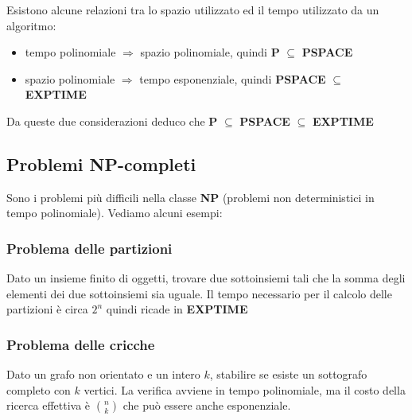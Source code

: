 \noindent Esistono alcune relazioni tra lo spazio utilizzato ed il tempo utilizzato da un algoritmo:
\begin{itemize}
    \item tempo polinomiale $\Rightarrow$ spazio polinomiale, quindi \textbf{P} $\subseteq$ \textbf{PSPACE}
    \item spazio polinomiale $\Rightarrow$ tempo esponenziale, quindi \textbf{PSPACE} $\subseteq$ \textbf{EXPTIME}
\end{itemize}

\noindent Da queste due considerazioni deduco che \textbf{P} $\subseteq$ \textbf{PSPACE} $\subseteq$ \textbf{EXPTIME}

\subsection{Problemi NP-completi}
Sono i problemi più difficili nella classe \textbf{NP} (problemi non deterministici in tempo polinomiale).
Vediamo alcuni esempi:
\subsubsection*{Problema delle partizioni}
Dato un insieme finito di oggetti, trovare due sottoinsiemi tali che la somma degli elementi dei due sottoinsiemi
sia uguale. Il tempo necessario per il calcolo delle partizioni è circa $2^n$ quindi ricade
in \textbf{EXPTIME}

\subsubsection*{Problema delle cricche}
Dato un grafo non orientato e un intero $k$, stabilire se esiste un sottografo completo
con $k$ vertici. La verifica avviene in tempo polinomiale, ma il costo della ricerca effettiva è
$\binom{n}{k}$ che può essere anche esponenziale.

